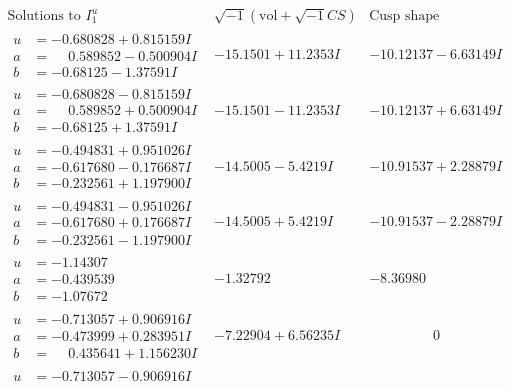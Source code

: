 \documentclass[1p]{elsarticle_modified}
\theoremstyle{definition}
\newcommand{\I}{\sqrt{-1}}
\begin{document}
$$\begin{array}{c|c|c}  
\text{Solutions to }I^u_{1}& \I (\text{vol} + \sqrt{-1}CS) & \text{Cusp shape}\\
 \hline 
\begin{aligned}
u &= -0.680828 + 0.815159 I \\
a &= \phantom{-}0.589852 - 0.500904 I \\
b &= -0.68125 - 1.37591 I\end{aligned}
 & -15.1501 + 11.2353 I & -10.12137 - 6.63149 I \\ \hline\begin{aligned}
u &= -0.680828 - 0.815159 I \\
a &= \phantom{-}0.589852 + 0.500904 I \\
b &= -0.68125 + 1.37591 I\end{aligned}
 & -15.1501 - 11.2353 I & -10.12137 + 6.63149 I \\ \hline\begin{aligned}
u &= -0.494831 + 0.951026 I \\
a &= -0.617680 - 0.176687 I \\
b &= -0.232561 + 1.197900 I\end{aligned}
 & -14.5005 - 5.4219 I & -10.91537 + 2.28879 I \\ \hline\begin{aligned}
u &= -0.494831 - 0.951026 I \\
a &= -0.617680 + 0.176687 I \\
b &= -0.232561 - 1.197900 I\end{aligned}
 & -14.5005 + 5.4219 I & -10.91537 - 2.28879 I \\ \hline\begin{aligned}
u &= -1.14307\phantom{ +0.000000I} \\
a &= -0.439539\phantom{ +0.000000I} \\
b &= -1.07672\phantom{ +0.000000I}\end{aligned}
 & -1.32792\phantom{ +0.000000I} & -8.36980\phantom{ +0.000000I} \\ \hline\begin{aligned}
u &= -0.713057 + 0.906916 I \\
a &= -0.473999 + 0.283951 I \\
b &= \phantom{-}0.435641 + 1.156230 I\end{aligned}
 & -7.22904 + 6.56235 I & \phantom{-0.000000 } 0 \\ \hline\begin{aligned}
u &= -0.713057 - 0.906916 I \\

\end{aligned}
\end{array}$$
\end{document}
